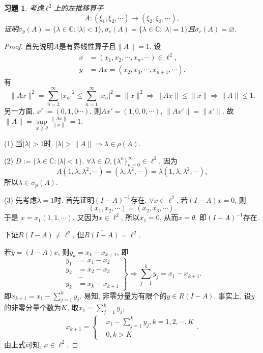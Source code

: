 \documentclass[UTF8,twoside]{ctexbook}
\newtheorem{exercise}{习题}[section]
\newcommand{\kx}{\mathbb}
\numberwithin{equation}{section}
\begin{document}
	\begin{exercise}
		考虑$\ell^2$上的左推移算子
		\[
		A: (\xi_1,\xi_2,\cdots)\mapsto(\xi_2,\xi_3,\cdots),
		\]
		证明$\sigma_p(A)=\{\lambda\in\mathbb C:|\lambda|<1\},\sigma_c(A)=\{\lambda\in\mathbb C:|\lambda|=1\}$且$\sigma_r(A)=\varnothing$.
	\end{exercise}
	\begin{proof}
		首先说明$A$是有界线性算子且$\|A\|=1$. 设
		\begin{align*}
		x&=(x_1,x_2,\cdots,x_n,\cdots)\in\ell^2, \\
		y&=Ax=(x_2,x_3,\cdots,x_{n+1},\cdots).
		\end{align*}
		有
		\[
		\|Ax\|^2=\sum_{n=2}^{\infty}|x_n|^2\leq\sum_{n=1}^{\infty}|x_n|^2=\|x\|^2
		\Longrightarrow
		\|Ax\|\leq\|x\|
		\Longrightarrow
		\|A\|\leq1.
		\]
		另一方面, $x':=(0,1,0\cdots)$, 则$Ax'=(1,0,0,\cdots)$, $\|Ax'\|=\|x'\|$. 故 $\|A\|=\sup\limits_{x\neq\theta}\frac{\|Ax\|}{\|x\|}=1.$

		(1) 当$|\lambda|>1$时, $|\lambda|>\|A\|\Longrightarrow \lambda\in\rho(A)$.

		(2) $D:=\{\lambda\in\kx C: |\lambda|<1\}.$ $\forall\lambda\in D, \{\lambda^n\}_{n=0}^\infty\in\ell^2.$ 因为
		\[
		A(1,\lambda,\lambda^2,\cdots)=(\lambda,\lambda^2,\cdots)=\lambda(1,\lambda,\lambda^2,\cdots),
		\]
		所以$\lambda\in\sigma_p(A).$

		(3) 先考虑$\lambda=1$时. 首先证明$(I-A)^{-1}$存在. $\forall x\in\ell^2$, 若$ (I-A)x=0$, 则
		\[
		(x_1,x_2,\cdots)=(x_2,x_3,\cdots).
		\]
		于是 $x=x_1(1,1,\cdots)$. 又因为$x\in\ell^2$, 所以$x_1=0$, 从而$x=\theta$. 即$(I-A)^{-1}$存在.

		下证$R(I-A)\neq\ell^2$, 但$\overline{R(I-A)}=\ell^2.$

		若$y=(I-A)x$, 则$y_k=x_k-x_{k+1}$, 即
		\[
		\left.
		\begin{aligned}
		y_1&=x_1-x_2\\
		y_2&=x_2-x_3\\
		&\cdots\\
		y_k&=x_k-x_{k+1}
		\end{aligned}
		\right\}
		\Longrightarrow
		\sum_{j=1}^k y_j=x_1-x_{k+1}.
		\]
		即$x_{k+1}=x_1-\sum_{j=1}^k y_j$. 易知, 非零分量为有限个的$y\in R(I-A)$. 事实上, 设$y$的非零分量个数为$K$, 取$x_1=\sum_{j=1}^k y_j$,
		\[
		x_{k+1}=\left\{
		\begin{aligned}
		&x_1-\sum_{j=1}^k y_j,k=1,2,\cdots,K\\
		&0,k>K
		\end{aligned}.
		\right.
		\]
		由上式可知, $x\in\ell^2$.


\end{proof}
\end{document}
